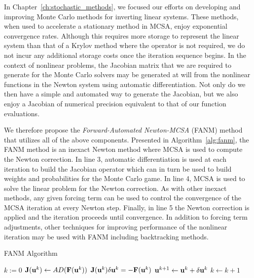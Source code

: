 In Chapter~\ref{ch:stochastic_methods}, we focused our efforts on
developing and improving Monte Carlo methods for inverting linear
systems. These methods, when used to accelerate a stationary method in
MCSA, enjoy exponential convergence rates. Although this requires more
storage to represent the linear system than that of a Krylov method
where the operator is not required, we do not incur any additional
storage costs once the iteration sequence begins. In the context of
nonlinear problems, the Jacobian matrix that we are required to
generate for the Monte Carlo solvers may be generated at will from the
nonlinear functions in the Newton system using automatic
differentiation. Not only do we then have a simple and automated way
to generate the Jacobian, but we also enjoy a Jacobian of numerical
precision equivalent to that of our function evaluations.

We therefore propose the \textit{Forward-Automated Newton-MCSA} (FANM)
method that utilizes all of the above components. Presented in
Algorithm~\ref{alg:fanm}, the FANM method is an inexact Newton method
where MCSA is used to compute the Newton correction. In line 3,
automatic differentiation is used at each iteration to build the
Jacobian operator which can in turn be used to build weights and
probabilities for the Monte Carlo game. In line 4, MCSA is used to
solve the linear problem for the Newton correction. As with other
inexact methods, any given forcing term can be used to control the
convergence of the MCSA iteration at every Newton step. Finally, in
line 5 the Newton correction is applied and the iteration proceeds
until convergence. In addition to forcing term adjustments, other
techniques for improving performance of the nonlinear iteration may be
used with FANM including backtracking methods.

\begin{algorithm}[h!]
  \caption{FANM Algorithm}
  \label{alg:fanm}
  \begin{algorithmic}[1]
    \State $k := 0$ 
    \State $\mathbf{J}(\mathbf{u}^{k}) \leftarrow AD(\mathbf{F}(\mathbf{u}^k))$ 
    \State $\mathbf{J}(\mathbf{u}^k) \delta \mathbf{u}^k = -\mathbf{F}(\mathbf{u}^{k})$
    \State $\mathbf{u}^{k+1} \leftarrow \mathbf{u}^k + \delta \mathbf{u}^k$ 
    \State $k \leftarrow k+1$ 
    \EndWhile
  \end{algorithmic}
\end{algorithm}

